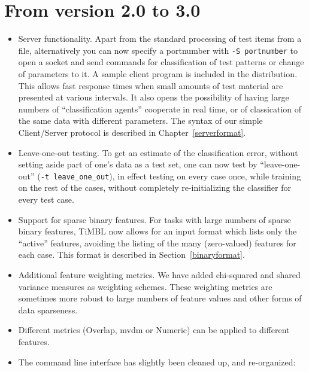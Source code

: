 \documentclass{report}
\begin{document}
\section{From version 2.0 to 3.0}

\begin{itemize}

\item Server functionality. Apart from the standard processing of test
items from a file, alternatively you can now specify a portnumber with
{\tt -S portnumber} to open a socket and send commands for
classification of test patterns or change of parameters to it. A
sample client program is included in the distribution. This allows
fast response times when small amounts of test material are presented
at various intervals. It also opens the possibility of having large
numbers of ``classification agents'' cooperate in real time, or of
classication of the same data with different parameters. The syntax of
our simple Client/Server protocol is described in
Chapter~\ref{serverformat}.

\item Leave-one-out testing. To get an estimate of the classification
error, without setting aside part of one's data as a test set, one
can now test by ``leave-one-out'' ({\tt -t leave\_one\_out}), in effect
testing on every case once, while training on the rest of the cases,
without completely re-initializing the classifier for every test case.

\item Support for sparse binary features. For tasks with large numbers
of sparse binary features, TiMBL now allows for an input format which
lists only the ``active'' features, avoiding the listing of the many
(zero-valued) features for each case. This format is described in
Section~\ref{binaryformat}.

\item Additional feature weighting metrics. We have added chi-squared
and shared variance measures as weighting schemes. These weighting
metrics are sometimes more robust to large numbers of feature values
and other forms of data sparseness.

\item Different metrics (Overlap, {\sc mvdm} or Numeric) can be
applied to different features.

\item The command line interface has slightly been cleaned up, and
re-organized:

\begin{itemize}


\end{itemize}
\end{itemize}
\end{document}
